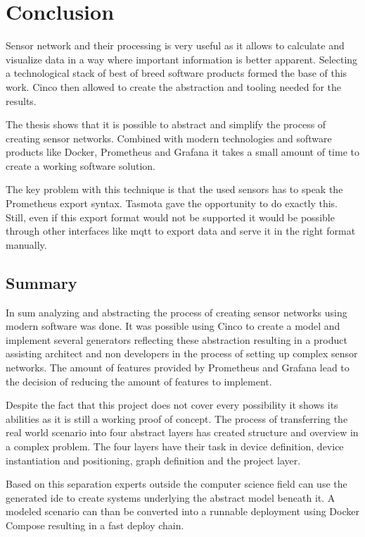 \chapter{Conclusion}
\label{chapter:conclusion}
Sensor network and their processing is very useful as it allows to calculate and visualize data in a way where important information is better apparent. Selecting a technological stack of best of breed software products formed the base of this work. Cinco then allowed to create the abstraction and tooling needed for the results.

The thesis shows that it is possible to abstract and simplify the process of creating sensor networks. Combined with modern technologies and software products like Docker, Prometheus and Grafana it takes a small amount of time to create a working software solution. 

The key problem with this technique is that the used sensors has to speak the Prometheus export syntax. Tasmota gave the opportunity to do exactly this. Still, even if this export format would not be supported it would be possible through other interfaces like \gls{mqtt} to export data and serve it in the right format manually. 

\section{Summary}
In sum analyzing and abstracting the process of creating sensor networks using modern software was done. It was possible using Cinco to create a model and implement several generators reflecting these abstraction resulting in a product assisting architect and non developers in the process of setting up complex sensor networks. The amount of features provided by Prometheus and Grafana lead to the decision of reducing the amount of features to implement. 

Despite the fact that this project does not cover every possibility it shows its abilities as it is still a working proof of concept. The process of transferring the real world scenario into four abstract layers has created structure and overview in a complex problem. The four layers have their task in device definition, device instantiation and positioning, graph definition and the project layer. 

Based on this separation experts outside the computer science field can use the generated \gls{ide} to create systems underlying the abstract model beneath it. A modeled scenario can than be converted into a runnable deployment using Docker Compose resulting in a fast deploy chain.

